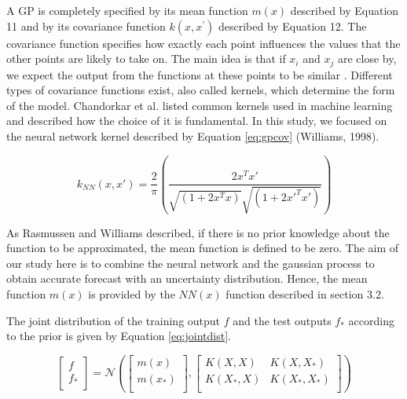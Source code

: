 A GP is completely specified by its mean function  \( m \left( x \right)  \) described by 
Equation 11 and by its covariance function  \( k \left( x,x^{'} \right)  \)  described by Equation 12. 
The covariance function specifies how exactly each point influences the values that the other points are 
likely to take on. The main idea is that if  \( x_{i} \) and  \( x_{j} \)  are close by, 
we expect the output from the functions at these points to be similar . Different types of covariance 
functions exist, also called kernels, which determine the form of the model. Chandorkar et al. \citet{ChandorkarDst} 
listed common kernels used in machine learning and described how the choice of it is fundamental. 
In this study, we focused on the neural network kernel described by Equation \ref{eq:gpcov} (Williams, 1998). 


\begin{equation}\label{eq:gpcov}
 k_{NN} \left( x, x' \right) = \frac{2}{ \pi } \left( \frac{2x^{T}x'}{\sqrt{ \left( 1+2x^{T} x \right) }\sqrt{ \left( 1+2x'^{T}x' \right)}} \right)
\end{equation}


As Rasmussen and Williams \citet{Rasmussen:2005:GPM:1162254} described, if there is no prior knowledge about 
the function to be approximated, the mean function is defined to be zero. The aim of our study here is to 
combine the neural network and the gaussian process to obtain accurate forecast with an uncertainty distribution. 
Hence, the mean function  \( m \left( x \right)  \)  is provided by the  \( NN \left( x \right)  \)  function 
described in section 3.2.


The joint distribution of the training output  \( f \)  and the test outputs  \( f_{\ast} \)  according to the 
prior is given by Equation \ref{eq:jointdist}. 

\begin{equation}\label{eq:jointdist}
  \left[ \begin{array}{ll}
	f\\
	f_{\ast}\\
	\end{array} \right] = \mathcal{N}   \left(  \left[ \begin{array}{ll}
	m \left( x \right) \\
	m \left( x_{\ast} \right) \\
	\end{array} \right] ,  \left[ \begin{matrix}
K \left( X,X \right)   &  K \left( X,X_{\ast} \right) \\
K \left( X_{\ast},X \right)   &  K \left( X_{\ast},X_{\ast} \right) \\
\end{matrix}
 \right]  \right) 
\end{equation}


